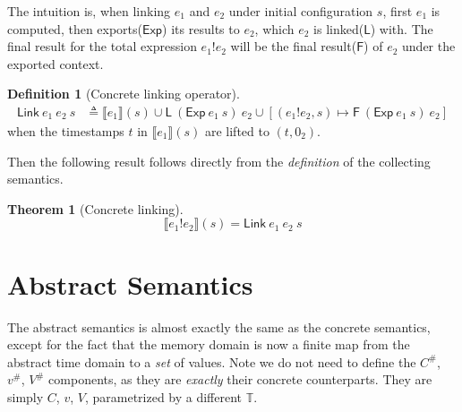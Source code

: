 \documentclass[acmsmall,review]{acmart}\settopmatter{printfolios=true,printccs=false,printacmref=false}
\theoremstyle{definition}
\newtheorem{definition}{Definition}[section]
\newtheorem{thm}{Theorem}[section]
\newcommand*{\A}[1]{{#1}^{\#}}
\newcommand*{\Time}{\mathbb{T}}
\newcommand*{\link}[2]{{#1}\mathtt{!}{#2}}
\newcommand*{\EE}{\mathsf{Exp}}
\newcommand*{\LL}{\mathsf{L}}
\newcommand*{\Link}{\mathsf{Link}}
\newcommand*{\sembracket}[1]{\lBrack{#1}\rBrack}
\begin{document}
The intuition is, when linking $e_1$ and $e_2$ under initial configuration $s$, first $e_1$ is computed, then exports($\EE$) its results to $e_2$, which $e_2$ is linked($\LL$) with.
The final result for the total expression $\link{e_1}{e_2}$ will be the final result($\mathsf{F}$) of $e_2$ under the exported context.

\begin{definition}[Concrete linking operator]
  \begin{align*}
    \Link\:e_1\:e_2\:s & \triangleq\sembracket{e_1}(s)\cup\LL\:(\EE\:e_1\:s)\:e_2\cup[(\link{e_1}{e_2},s)\mapsto\mathsf{F}\:(\EE\:e_1\:s)\:e_2]
  \end{align*}
  when the timestamps $t$ in $\sembracket{e_1}(s)$ are lifted to $(t,0_2)$.
\end{definition}

Then the following result follows directly from the \emph{definition} of the collecting semantics.

\begin{thm}[Concrete linking]
  \[
    \sembracket{\link{e_1}{e_2}}(s)=\Link\:e_1\:e_2\:s
  \]
\end{thm}

\section{Abstract Semantics}

The abstract semantics is almost exactly the same as the concrete semantics, except for the fact that the memory domain is now a finite map from the abstract time domain to a \emph{set} of values.
Note we do not need to define the $\A{C}$, $\A{v}$, $\A{V}$ components, as they are \emph{exactly} their concrete counterparts.
They are simply $C$, $v$, $V$, parametrized by a different $\Time$.
\end{document}
